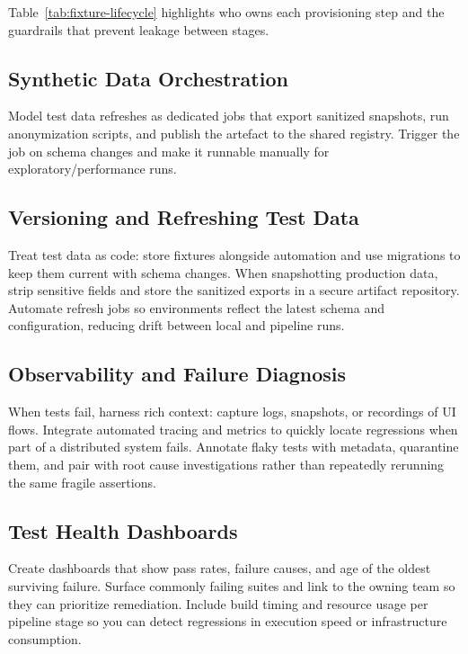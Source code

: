 Table~\ref{tab:fixture-lifecycle} highlights who owns each provisioning step and the guardrails that prevent leakage between stages.

\subsection{Synthetic Data Orchestration}

Model test data refreshes as dedicated jobs that export sanitized snapshots, run anonymization scripts, and publish the artefact to the shared registry. Trigger the job on schema changes and make it runnable manually for exploratory/performance runs.

\subsection{Versioning and Refreshing Test Data}

Treat test data as code: store fixtures alongside automation and use migrations to keep them current with schema changes. When snapshotting production data, strip sensitive fields and store the sanitized exports in a secure artifact repository. Automate refresh jobs so environments reflect the latest schema and configuration, reducing drift between local and pipeline runs.

\subsection{Observability and Failure Diagnosis}

When tests fail, harness rich context: capture logs, snapshots, or recordings of UI flows. Integrate automated tracing and metrics to quickly locate regressions when part of a distributed system fails. Annotate flaky tests with metadata, quarantine them, and pair with root cause investigations rather than repeatedly rerunning the same fragile assertions.

\subsection{Test Health Dashboards}

Create dashboards that show pass rates, failure causes, and age of the oldest surviving failure. Surface commonly failing suites and link to the owning team so they can prioritize remediation. Include build timing and resource usage per pipeline stage so you can detect regressions in execution speed or infrastructure consumption.

